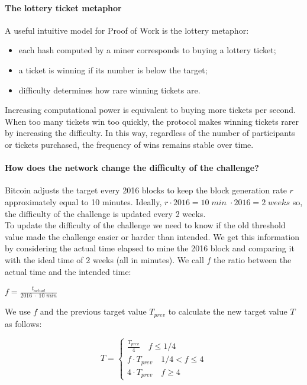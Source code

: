 \documentclass{scrbook}
\begin{document}
\paragraph{The lottery ticket metaphor}

A useful intuitive model for Proof of Work is the lottery metaphor:

\begin{itemize}
    \item each hash computed by a miner corresponds to buying a lottery ticket;
    \item a ticket is winning if its number is below the target;
    \item difficulty determines how rare winning tickets are.
\end{itemize}

Increasing computational power is equivalent to buying more tickets per second. When too many tickets win too quickly, the protocol makes winning tickets rarer by increasing the difficulty. In this way, regardless of the number of participants or tickets purchased, the frequency of wins remains stable over time.

\paragraph{How does the network change the difficulty of the challenge?}

Bitcoin adjusts the target every 2016 blocks to keep the block generation rate $r$ approximately equal to 10 minutes.  Ideally, $r \cdot 2016 = 10 \; min \; \cdot 2016 = 2 \; weeks$ so, the difficulty of the challenge is updated every 2 weeks. \\

To update the difficulty of the challenge we need to know if the old threshold value made the challenge easier or harder than intended. We get this information by considering the actual time elapsed to mine the 2016 block and comparing it with the ideal time of 2 weeks (all in minutes). We call $f$ the ratio between the actual time and the intended time:

\begin{center}
    $f = \frac{t_{actual}}{2016 \; \cdot \; 10 \; min}$
\end{center}

We use $f$ and the previous target value $T_{prev}$ to calculate the new target value $T$ as follows:

\begin{center}
    \[
        T =
        \begin{cases}
            \frac{T_{prev}}{4} \quad f \leq 1/4 \\
            f\cdot T_{prev} \quad 1/4 < f \leq 4 \\
            4 \cdot T_{prev} \quad f \geq 4
        \end{cases}
    \]
\end{center}
\end{document}
